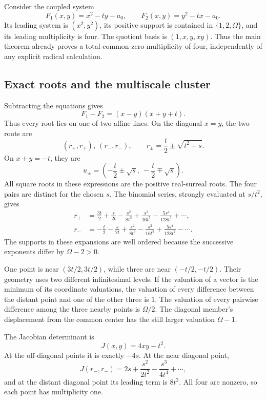 \documentclass[11pt,letterpaper]{article}
\theoremstyle{definition}
\theoremstyle{remark}
\numberwithin{equation}{section}
\begin{document}
Consider the coupled system
\begin{equation}\label{eq:exampleF}
 F_1(x,y)=x^2-ty-a_0,
 \qquad F_2(x,y)=y^2-tx-a_0.
\end{equation}
Its leading system is $(x^2,y^2)$, its positive support is contained in $\{1,2,\Omega\}$, and its leading multiplicity is four. The quotient basis is $(1,x,y,xy)$. Thus the main theorem already proves a total common-zero multiplicity of four, independently of any explicit radical calculation.

\subsection{Exact roots and the multiscale cluster}
Subtracting the equations gives
\[
 F_1-F_2=(x-y)(x+y+t).
\]
Thus every root lies on one of two affine lines. On the diagonal $x=y$, the two roots are
\begin{equation}\label{eq:diagroots}
 (r_+,r_+),\ (r_-,r_-),\qquad
 r_\pm=\frac t2\pm\sqrt{t^2+s}.
\end{equation}
On $x+y=-t$, they are
\begin{equation}\label{eq:offroots}
 u_\pm=\left(-\frac t2\pm\sqrt s,\ -\frac t2\mp\sqrt s\right).
\end{equation}
All square roots in these expressions are the positive real-surreal roots. The four pairs are distinct for the chosen $s$. The binomial series, strongly evaluated at $s/t^2$, gives
\begin{align}
 r_+&=\frac{3t}{2}+\frac{s}{2t}-\frac{s^2}{8t^3}
              +\frac{s^3}{16t^5}-\frac{5s^4}{128t^7}+\cdots,\label{eq:rplus}\\
 r_-&=-\frac{t}{2}-\frac{s}{2t}+\frac{s^2}{8t^3}
              -\frac{s^3}{16t^5}+\frac{5s^4}{128t^7}-\cdots.\label{eq:rminus}
\end{align}
The supports in these expansions are well ordered because the successive exponents differ by $\Omega-2>0$.

One point is near $(3t/2,3t/2)$, while three are near $(-t/2,-t/2)$. Their geometry uses two different infinitesimal levels. If the valuation of a vector is the minimum of its coordinate valuations, the valuation of every difference between the distant point and one of the other three is $1$. The valuation of every pairwise difference among the three nearby points is $\Omega/2$. The diagonal member's displacement from the common center has the still larger valuation $\Omega-1$.

The Jacobian determinant is
\begin{equation}\label{eq:Jexample}
 J(x,y)=4xy-t^2.
\end{equation}
At the off-diagonal points it is exactly $-4s$. At the near diagonal point,
\[
 J(r_-,r_-)=2s+\frac{s^2}{2t^2}-\frac{s^3}{4t^4}+\cdots,
\]
and at the distant diagonal point its leading term is $8t^2$. All four are nonzero, so each point has multiplicity one.
\end{document}
